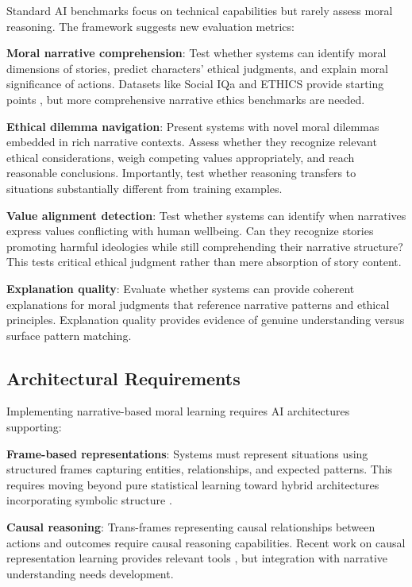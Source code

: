 \documentclass[12pt]{article}
\begin{document}
Standard AI benchmarks focus on technical capabilities but rarely assess moral reasoning. The framework suggests new evaluation metrics:

\textbf{Moral narrative comprehension}: Test whether systems can identify moral dimensions of stories, predict characters' ethical judgments, and explain moral significance of actions. Datasets like Social IQa and ETHICS provide starting points \citep{sap2019socialiqa, hendrycks2021aligning}, but more comprehensive narrative ethics benchmarks are needed.

\textbf{Ethical dilemma navigation}: Present systems with novel moral dilemmas embedded in rich narrative contexts. Assess whether they recognize relevant ethical considerations, weigh competing values appropriately, and reach reasonable conclusions. Importantly, test whether reasoning transfers to situations substantially different from training examples.

\textbf{Value alignment detection}: Test whether systems can identify when narratives express values conflicting with human wellbeing. Can they recognize stories promoting harmful ideologies while still comprehending their narrative structure? This tests critical ethical judgment rather than mere absorption of story content.

\textbf{Explanation quality}: Evaluate whether systems can provide coherent explanations for moral judgments that reference narrative patterns and ethical principles. Explanation quality provides evidence of genuine understanding versus surface pattern matching.

\subsection{Architectural Requirements}

Implementing narrative-based moral learning requires AI architectures supporting:

\textbf{Frame-based representations}: Systems must represent situations using structured frames capturing entities, relationships, and expected patterns. This requires moving beyond pure statistical learning toward hybrid architectures incorporating symbolic structure \citep{garcez2019neurosymbolic}.

\textbf{Causal reasoning}: Trans-frames representing causal relationships between actions and outcomes require causal reasoning capabilities. Recent work on causal representation learning provides relevant tools \citep{scholkopf2021toward}, but integration with narrative understanding needs development.
\end{document}
